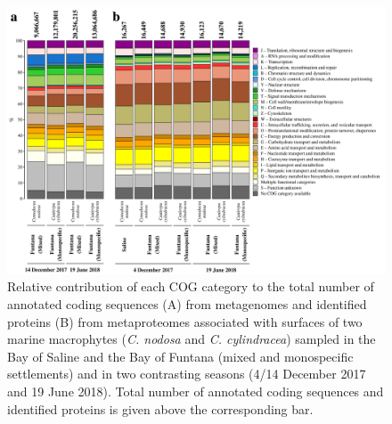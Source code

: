 \documentclass[12pt,]{article}
\begin{document}
\newpage
\begin{figure}[ht]

{\centering \includegraphics[width=1\linewidth]{../results/figures/cog} 

}

\caption{Relative contribution of each COG category to the total number of annotated coding sequences (A) from metagenomes and identified proteins (B) from metaproteomes associated with surfaces of two marine macrophytes (\textit{C. nodosa} and \textit{C. cylindracea}) sampled in the Bay of Saline and the Bay of Funtana (mixed and monospecific settlements) and in two contrasting seasons (4/14 December 2017 and 19 June 2018). Total number of annotated coding sequences and identified proteins is given above the corresponding bar.\label{cog}}\label{fig:unnamed-chunk-5}
\end{figure}
\end{document}
